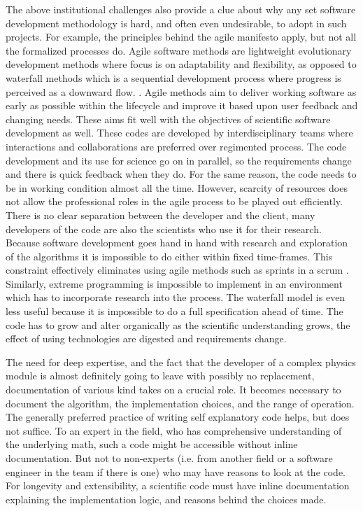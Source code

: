 The above institutional challenges also provide a clue about why any
set software development methodology is hard, and often even
undesirable, to adopt in such projects. For example, the principles
behind the agile manifesto apply, but not all the formalized processes
do. Agile software methods are lightweight evolutionary development
methods where focus is on adaptability and flexibility, as opposed to
waterfall methods which is a sequential development process where
progress is perceived as a downward flow. \cite{}. 
Agile methods aim to deliver working software as early as possible
within the lifecycle and improve it based upon user feedback and
changing needs. These aims fit well with the objectives of scientific
software development as well. 
These codes are developed by interdisciplinary teams where
interactions and collaborations are preferred over regimented process. The code
development and its use for science go on in parallel, so the
requirements change and there is quick feedback when they do.  For the
same reason, the code needs to be in working condition almost all the
time. However, scarcity of resources does not allow the professional roles in
the agile process to be played out efficiently.  There is no clear
separation between the developer and the client, many developers of
the code are also the scientists who use it for their research. 
Because software development goes hand in hand with research and
exploration of the algorithms it is impossible to do either within
fixed time-frames. This constraint effectively eliminates using agile
methods such as sprints in a scrum \cite{}. Similarly, extreme
programming is impossible to implement in an environment which has to
incorporate research into the process. The waterfall model is even less
useful because it is impossible to do a full specification ahead of
time. The code has to grow and alter organically as the scientific
understanding grows, the effect of using technologies are digested and
requirements change. 

The need for deep expertise, and the fact that the developer of a
complex physics module is almost definitely going to leave with
possibly no replacement, documentation of various kind takes on a
crucial role. It becomes necessary to document the algorithm, the
implementation choices, and the range of operation. The generally
preferred practice of writing self explanatory code helps, but does
not suffice. To an expert in the field, who has comprehensive
understanding of the underlying math, such a code might be accessible
without inline documentation. But not to non-experts (i.e. from
another field or a software engineer in the team if there is one) who
may have reasons to look at the code. For longevity and
extensibility, a scientific code must have inline documentation
explaining the implementation logic, and reasons behind the
choices made.   
